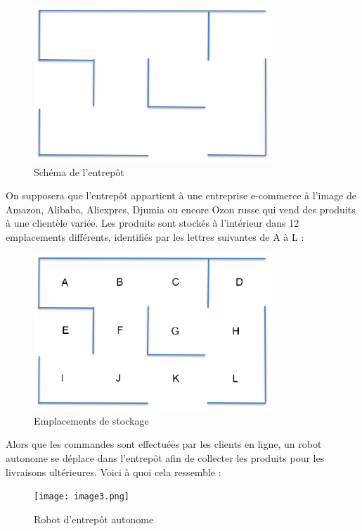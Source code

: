 \documentclass{article}
\begin{document}
\begin{figure}[h]
    \centering
    \includegraphics[width=0.8\textwidth]{image1.png} 
    \caption{Schéma de l'entrepôt}
    \label{fig:Schéma de l'entrepôt}
\end{figure}


On supposera que l'entrepôt appartient à une entreprise e-commerce à l'image de Amazon, Alibaba, Aliexpres, Djumia ou encore Ozon russe qui vend des produits à une clientèle variée. Les produits sont stockés à l'intérieur dans 12 emplacements différents, identifiés par les lettres suivantes de A à L :

\begin{figure}[h]
    \centering
    \includegraphics[width=0.8\textwidth]{image2.png} 
    \caption{Emplacements de stockage}
    \label{fig:Emplacements de stockage}
\end{figure}
Alors que les commandes sont effectuées par les clients en ligne, un robot autonome se déplace dans l'entrepôt afin de collecter les produits pour les livraisons ultérieures. Voici à quoi cela ressemble :
\begin{figure}[h]
    \centering
    \texttt{[image: image3.png]} 
    \caption{Robot d'entrepôt autonome}
    \label{fig:Robot d'entrepôt autonome}
\end{figure}
\end{document}
